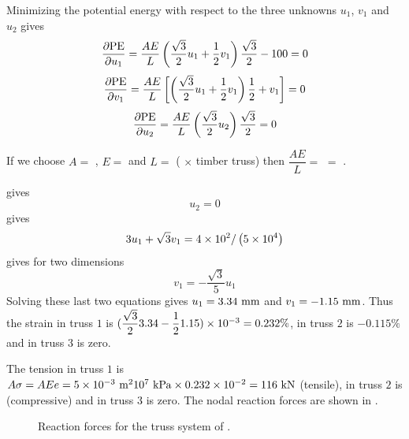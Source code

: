 Minimizing the potential energy with respect to the three unknowns $u_{1}$,
$v_{1}$ and $u_{2}$  gives
\begin{equation}
   \dfrac{\partial \text{PE}}{\partial u_{1}}  = \dfrac{AE}{L}\left( \dfrac{\sqrt{3}}{2} 
    u_{1} + \dfrac{1}{2} v_{1} \right)\dfrac{\sqrt{3}}{2} - 100=0
  \label{eqn:poten1}
\end{equation}
\begin{equation}
   \dfrac{\partial \text{PE}}{\partial v_{1}}   =  \dfrac{AE}{L}\left[ \left( 
    \dfrac{\sqrt{3}}{2} u_{1} + \dfrac{1}{2} v_{1} \right)\dfrac{1}{2} +v_{1} \right]=0
  \label{eqn:poten2}
\end{equation}
\begin{equation}
   \dfrac{\partial \text{PE}}{\partial u_{2}}  =  \dfrac{AE}{L}\left( \dfrac{\sqrt{3}}{2} 
    u_{2}\right)\dfrac{\sqrt{3}}{2}=0
  \label{eqn:poten3}
\end{equation}
  
If we choose $A =$ , $E =$  and
 $L = $  (\eg {} $\times$  timber truss) 
 then $\dfrac{AE}{L} =$  
  $ = $ .

 gives 
\begin{displaymath}  
  u_{2} = 0
\end{displaymath} 
 gives 
\begin{displaymath}
  3u_{1}+\sqrt{3}v_{1}=4\times 10^{2} /\left( 5\times 10^{4}  \right)
\end{displaymath}
 gives for two dimensions
\begin{displaymath}
  v_{1} = -\dfrac{\sqrt{3}}{5}u_{1}
\end{displaymath}
Solving these last two equations gives $u_{1}= 3.34~\mathrm{mm} $ and
$v_{1}= -1.15~\mathrm{mm} $.  Thus the strain in truss $1$ is
$(\dfrac{\sqrt{3}}{2}3.34-\dfrac{1}{2}1.15) \times  10^{-3}  =0.232\%$, in
truss $2$ is $-0.115\%$ and in truss $3$ is zero.

The tension in truss $1$ is $A\sigma = AEe =  5\times 10^{-3} ~\mathrm{\mathrm{m}^{2}} 
  10^{7} ~\mathrm{kPa}  \times 0.232\times 10^{-2}  =  116~\mathrm{kN} $ (tensile),
in truss $2$ is  (compressive) and in truss $3$ is zero. The
nodal reaction forces are shown in .
    
\begin{figure}[htbp] \centering
  
  \caption{Reaction forces for the truss system of .}
  \label{fig:rf}
\end{figure}


